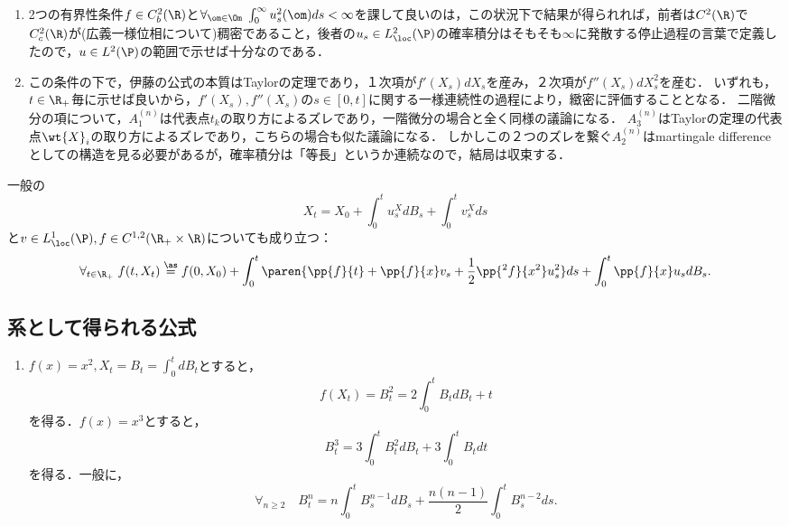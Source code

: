 \documentclass[uplatex,dvipdfmx]{jsreport}
\begin{document}
\begin{remarks}\mbox{}
    \begin{enumerate}
        \item 2つの有界性条件$f\in C^2_b(\R)$と$\forall_{\om\in\Om}\;\int^\infty_0u_s^2(\om)ds<\infty$を課して良いのは，この状況下で結果が得られれば，前者は$C^2(\R)$で$C_c^2(\R)$が(広義一様位相について)稠密であること，後者の$u_s\in L^2_\loc(\P)$の確率積分はそもそも$\infty$に発散する停止過程の言葉で定義したので，$u\in L^2(\P)$の範囲で示せば十分なのである．
        \item この条件の下で，伊藤の公式の本質はTaylorの定理であり，１次項が$f'(X_s)dX_s$を産み，２次項が$f''(X_s)dX_s^2$を産む．
        いずれも，$t\in\R_+$毎に示せば良いから，$f'(X_s),f''(X_s)$の$s\in[0,t]$に関する一様連続性の過程により，緻密に評価することとなる．
        二階微分の項について，$A_1^{(n)}$は代表点$t_k$の取り方によるズレであり，一階微分の場合と全く同様の議論になる．
        $A_3^{(n)}$はTaylorの定理の代表点$\wt{X}_i$の取り方によるズレであり，こちらの場合も似た議論になる．
        しかしこの２つのズレを繋ぐ$A_2^{(n)}$はmartingale differenceとしての構造を見る必要があるが，確率積分は「等長」というか連続なので，結局は収束する．
    \end{enumerate}
\end{remarks}

\begin{lemma}
    一般の
    \[X_t=X_0+\int^t_0u^X_sdB_s+\int^t_0v_s^Xds\]
    と$v\in L^1_\loc(\P),f\in C^{1,2}(\R_+\times\R)$についても成り立つ：
    \[\forall_{t\in\R_+}\;f(t,X_t)\overset{\as}{=}f(0,X_0)+\int^t_0\paren{\pp{f}{t}+\pp{f}{x}v_s+\frac{1}{2}\pp{^2f}{x^2}u^2_s}ds+\int^t_0\pp{f}{x}u_sdB_s.\]
\end{lemma}

\subsection{系として得られる公式}

\begin{example}\mbox{}\label{exp-n-exponential-of-Brownian-motion}
    \begin{enumerate}
        \item $f(x)=x^2,X_t=B_t=\int^t_0dB_t$とすると，
        \[f(X_t)=B_t^2=2\int^t_0B_tdB_t+t\]
        を得る．$f(x)=x^3$とすると，
        \[B_t^3=3\int^t_0B^2_tdB_t+3\int^t_0B_tdt\]
        を得る．一般に，
        \[\forall_{n\ge2}\quad B^n_t=n\int^t_0B_s^{n-1}dB_s+\frac{n(n-1)}{2}\int^t_0B_s^{n-2}ds.\]
    \end{enumerate}
\end{example}
\end{document}
